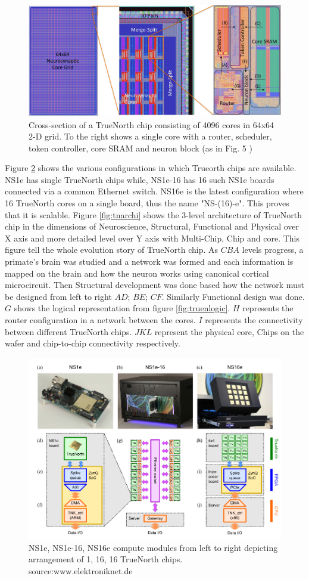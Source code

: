 \documentclass[11pt,twoside]{article}
\begin{document}
\begin{figure}
	\centering
	\includegraphics[width=0.8\linewidth]{Report-LateX-Template/fig/physic.PNG}
	\caption{Cross-section of a TrueNorth chip consisting of 4096 cores in 64x64 2-D grid. To the right shows a single core with a router, scheduler, token controller, core SRAM and neuron block (as in Fig. 5 \cite{akopyan2015truenorth})}
	\label{fig:physic}
\end{figure}

Figure \ref{fig:NS1e} shows the various configurations in which Trueorth chips are available. NS1e has single TrueNorth chips while, NS1e-16 has 16 such NS1e boards connected via a common Ethernet switch. NS16e is the latest configuration where 16 TrueNorth cores on a single board, thus the name "NS-(16)-e". This proves that it is scalable. Figure \ref{fig:tnarchi} shows the 3-level architecture of TrueNorth chip in the dimensions of Neuroscience, Structural, Functional and Physical over X axis and more detailed level over Y axis with Multi-Chip, Chip and core. This figure tell the whole evolution story of TrueNorth chip. As $C B A$ levels progress, a primate's brain was studied and a network was formed and each information is mapped on the brain and how the neuron works using canonical cortical microcircuit. Then Structural development was done based how the network must be designed from left to right $A D$; $B E$; $C F$. Similarly Functional design was done. $G$ shows the logical representation from figure \ref{fig:truenlogic}. $H$ represents the router configuration in a network between the cores. $I$ represents the connectivity between different TrueNorth chips. $J K L$ represent the physical core, Chips on the wafer and chip-to-chip connectivity respectively.


\begin{figure}
	\centering
	\includegraphics[width=0.6\linewidth]{Report-LateX-Template/fig/NS1e.png}
	\caption{NS1e, NS1e-16, NS16e compute modules from left to right depicting arrangement of 1, 16, 16 TrueNorth chips. source:www.elektroniknet.de}
	\label{fig:NS1e}
\end{figure}
\end{document}
